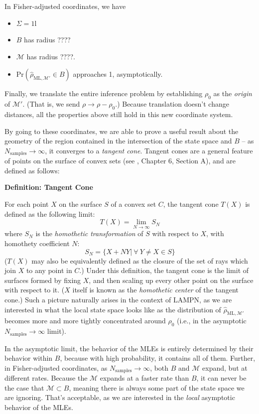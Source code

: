 \documentclass[aps,pra, twocolumn]{revtex4-1}
\newcommand{\M}{\mathcal{M}}
\newcommand{\Id}{\mathbb{I}}
\def\Id{1\!\mathrm{l}}
\newcommand{\rhohat}{\hat{\rho}}
\newcommand{\rhoML}[1]{\rhohat_{\scriptscriptstyle{\mathrm{ML},#1}}}
\begin{document}
In Fisher-adjusted coordinates, we have

 \begin{itemize}
 \item $\Sigma = \Id$
 \item $B$ has radius ????
 \item $\M$ has radius ????.
 \item $\mathrm{Pr}\left(\rhoML{\M'} \in B\right)$ approaches 1, asymptotically.
 \end{itemize}

Finally, we translate the entire inference problem by establishing $\rho_{0}$ as the \emph{origin} of $\M'$. (That is, we send $\rho \rightarrow \rho - \rho_{0}$.) Because translation doesn't change distances, all the properties above still hold in this new coordinate system.

By going to these coordinates, we are able to prove a useful result about the geometry of the region contained in the intersection of the state space and $B$ --  as $N_{\mathrm{samples}} \rightarrow \infty$, it converges to a \emph{tangent cone}. Tangent cones are a general feature of points on the surface of convex sets (see \cite{Rockafellar1998}, Chapter 6, Section A), and are defined as follows:

\textbf{Definition: Tangent Cone}

For each point $X$ on the surface $S$ of a convex set $C$, the tangent cone $T(X)$ is defined as the following limit:
\[T(X) = \lim_{N\rightarrow \infty} S_{N}\]
where $S_{N}$ is the \emph{homothetic transformation} of $S$ with respect to $X$, with homothety coefficient $N$:
\[S_{N} = \{X + NY  |~\forall ~Y \neq X \in S\}\]
($T(X)$ may also be equivalently defined as the closure of the set of rays which join $X$ to any point in $C$.)
Under this definition, the tangent cone  is the limit of surfaces formed by fixing $X$, and then scaling up every other point on the surface with respect to it. ($X$ itself is known as the \emph{homothetic center} of the tangent cone.) Such a picture naturally arises in the context of LAMPN, as we are interested in what the local state space looks like as the distribution of $\rhoML{\M'}$ becomes more and more tightly concentrated around $\rho_{0}$ (i.e., in the asymptotic $N_{\mathrm{samples}}\rightarrow \infty$ limit).

In the asymptotic limit, the behavior of the MLEs is entirely determined by their behavior within $B$, because with high probability, it contains all of them. Further, in Fisher-adjusted coordinates, as $N_{\mathrm{samples}}\rightarrow \infty$, both $B$ and $\M$ expand, but at different rates. Because the $\M$ expands at a faster rate than $B$, it can never be the case that $\M \subset B$, meaning there is always some part of the state space we are ignoring. That's acceptable, as we are interested in the \emph{local} asymptotic behavior of the MLEs.
\end{document}
